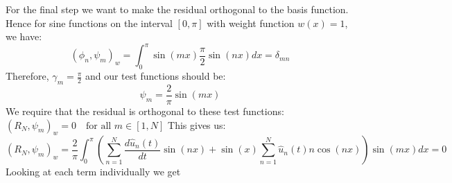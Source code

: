 For the final step we want to make the residual orthogonal to the basis function. Hence for sine functions on the interval $[0,\pi]$ with weight function $w(x)=1$, we have:
\begin{equation}
	(\phi_n, \psi_m)_w = \int_0^{\pi} \sin(mx) \frac{\pi}{2}\sin(nx) dx = \delta_{mn}
	\label{eq:weight_f}
\end{equation}
Therefore, $\gamma_m = \frac{\pi}{2}$ and our test functions should be:
\begin{equation}
	\psi_m = \frac{2}{\pi}\sin(mx)
	\label{eq:test2}
\end{equation}
We require that the residual is orthogonal to these test functions:
$(R_N, \psi_m)_w = 0 \quad \text{for all } m \in[1, N]$
This gives us:
\begin{equation}
	\left(R_N, \psi_m\right)_w  = \frac{2}{\pi} \int_0^{\pi} \left ( \sum_{n=1}^{N} \frac{d\hat{u}_n(t)}{dt} \sin(nx) + \sin(x)  \sum_{n=1}^{N} \hat{u}_n(t) n \cos(nx) \right) \sin(mx) dx = 0
	\label{eq:res_der}
\end{equation}
Looking at each term individually we get

